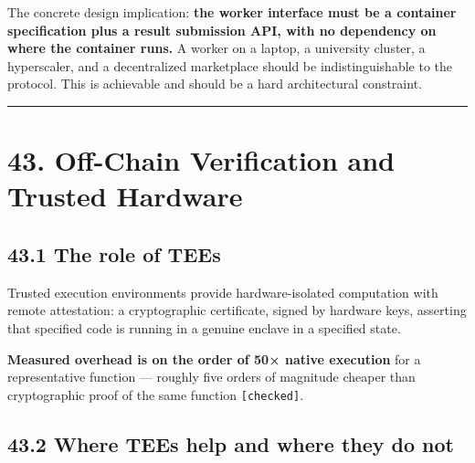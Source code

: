 \documentclass[
  11pt]{report}
\begin{document}
The concrete design implication: \textbf{the worker interface must be a
container specification plus a result submission API, with no dependency
on where the container runs.} A worker on a laptop, a university
cluster, a hyperscaler, and a decentralized marketplace should be
indistinguishable to the protocol. This is achievable and should be a
hard architectural constraint.

\begin{center}\rule{0.5\linewidth}{0.5pt}\end{center}

\hypertarget{off-chain-verification-and-trusted-hardware}{%
\chapter{43. Off-Chain Verification and Trusted
Hardware}\label{off-chain-verification-and-trusted-hardware}}

\hypertarget{the-role-of-tees}{%
\section{43.1 The role of TEEs}\label{the-role-of-tees}}

Trusted execution environments provide hardware-isolated computation
with remote attestation: a cryptographic certificate, signed by hardware
keys, asserting that specified code is running in a genuine enclave in a
specified state.

\textbf{Measured overhead is on the order of 50× native execution} for a
representative function --- roughly five orders of magnitude cheaper
than cryptographic proof of the same function \texttt{{[}checked{]}}.

\hypertarget{where-tees-help-and-where-they-do-not}{%
\section{43.2 Where TEEs help and where they do
not}\label{where-tees-help-and-where-they-do-not}}
\end{document}
